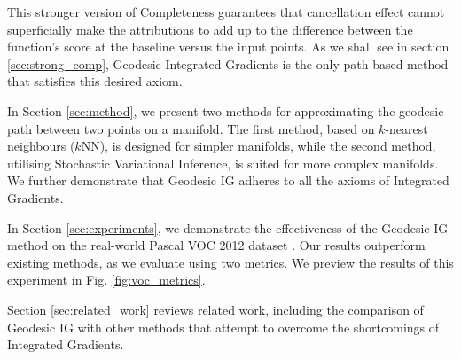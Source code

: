 This stronger version of Completeness guarantees that cancellation effect cannot superficially make the attributions to add up to the difference between the function's score at the baseline versus the input points. As we shall see in section \ref{sec:strong_comp}, Geodesic Integrated Gradients is the only path-based method that satisfies this desired axiom.

In Section \ref{sec:method}, we present two methods for approximating the geodesic path between two points on a manifold. The first method, based on $k$-nearest neighbours ($k$NN), is designed for simpler manifolds, while the second method, utilising Stochastic Variational Inference, is suited for more complex manifolds. We further demonstrate that Geodesic IG adheres to all the axioms of Integrated Gradients.


In Section \ref{sec:experiments}, we demonstrate the effectiveness of the Geodesic IG method on the real-world Pascal VOC 2012 dataset \cite{pascal-voc-2012}. Our results outperform existing methods, as we evaluate using two metrics. We preview the results of this experiment in Fig. \ref{fig:voc_metrics}.

Section \ref{sec:related_work} reviews related work, including the comparison of Geodesic IG with other methods that attempt to overcome the shortcomings of Integrated Gradients.